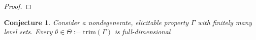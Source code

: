 \documentclass[12pt]{article}
\newcommand{\Comments}{1}
\newcommand{\mynote}[2]{\ifnum\Comments=1\textcolor{#1}{#2}\fi}
\newcommand{\jessie}[1]{\mynote{purple}{[JF: #1]}}
\newcommand{\R}{\mathcal{R}}
\newcommand{\trim}{\mathrm{trim}}
\newcommand{\strip}{\mathrm{strip}}
\newtheorem{conjecture}{Conjecture}
\begin{document}
\begin{proof}
	
%	
%	
%	
%	
	
\end{proof}




\begin{conjecture}\label{conj:trim-full-dim}
	Consider a nondegenerate, elicitable property $\Gamma$ with finitely many level sets.
	Every $\theta \in \Theta := \trim(\Gamma)$ is full-dimensional  
\end{conjecture}
\end{document}

